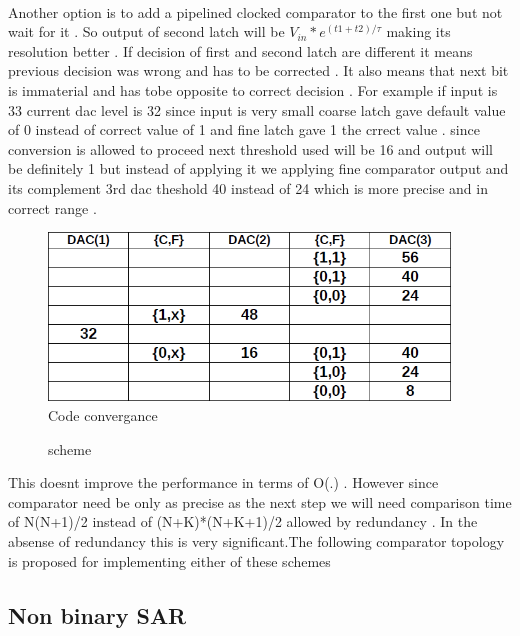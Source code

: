 \documentclass[a4paper,10pt,fleqn,titlepage,twoside]{article}
\begin{document}
\paragraph{}
Another option is to add a pipelined clocked comparator to the first one but not wait for it . So output of second latch will be 
$V_{in}*e^{(t1+t2)/\tau}$ making its resolution better . If decision of first and second latch are different it means previous decision was wrong and has to be corrected . It also means that next bit is immaterial and has tobe opposite to
correct decision  . For example if input is 33 current dac level is 32 since input is very small coarse latch gave default value of 0 instead of correct value of 1 and fine latch gave 1 the crrect value . since conversion is allowed to proceed
next threshold used will be 16 and output will be definitely 1 but instead of applying it we applying fine comparator output and its complement 3rd dac theshold 40 instead of 24 which is more precise and in correct range .
\begin{figure}[hp]
\centering
\includegraphics[width=0.95\textwidth]{./img/code.png}
\caption{Code convergance}
\label{fig:pipeCmpCodeConveragnce}
\end{figure}
\begin{figure}[hp]
\centering
\setlength\fboxsep{5.0pt}
\setlength\fboxrule{0.5pt}
\caption{scheme}
\label{fig:archReinforce}
\end{figure}
This doesnt improve the performance in terms of O(.) . However since comparator need be only as precise as the next step we will need comparison time of N(N+1)/2 instead of (N+K)*(N+K+1)/2 allowed by redundancy .
In the absense of redundancy this is very significant.The following comparator topology is proposed for implementing either of these schemes
\newpage
\subsection*{Non binary SAR}
\end{document}
